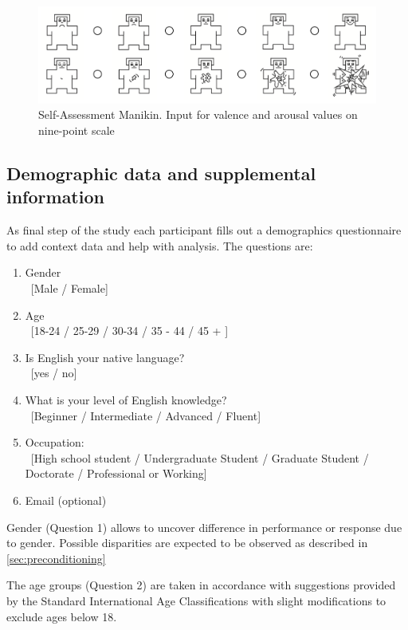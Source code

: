 \begin{figure}[h]
	\centering
	\includegraphics[width=0.9\linewidth]{graphics/SAM}
	\caption{Self-Assessment Manikin. Input for valence and arousal values on nine-point scale}
	\label{fig:sam}
\end{figure}

	
	\subsection{Demographic data and supplemental information} \label{sec:demographics}
	
	As final step of the study each participant fills out a demographics questionnaire to add context data and help with analysis. The questions are:
	
	\begin{enumerate}
		\item Gender \\ \ [Male / Female]
		\item Age \\ \ [18-24 / 25-29 / 30-34 / 35 - 44 / 45 + ]
		\item Is English your native language? \\ \ [yes / no]
		\item What is your level of English knowledge? \\ \
			[Beginner  / Intermediate / Advanced / Fluent]
		\item Occupation: \\ \ [High school student / Undergraduate Student / Graduate Student / Doctorate / Professional or Working]
		\item Email (optional)
	\end{enumerate}

	Gender (Question 1) allows to uncover difference in performance or response due to gender. Possible disparities are expected to be observed as described in \ref{sec:preconditioning}

	The age groups (Question 2) are taken in accordance with suggestions provided by the Standard International Age Classifications \cite{UN1982} with slight modifications to exclude ages below 18.
	
